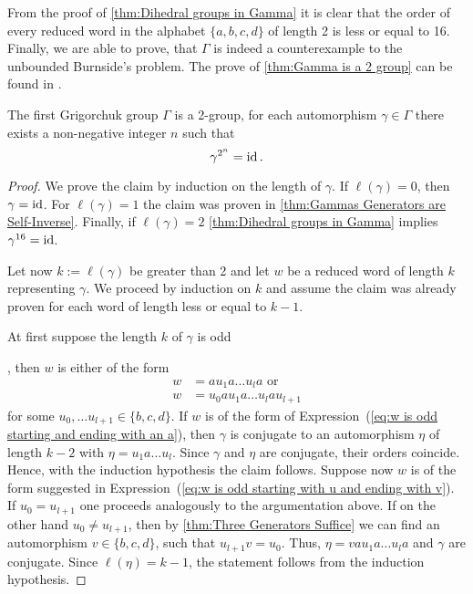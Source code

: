 From the proof of \cref{thm:Dihedral groups in Gamma} it is clear that the order of every reduced word in the alphabet $\lbrace a,b,c,d \rbrace$ of length 2 is less or equal to 16. Finally, we are able to prove, that $\Gamma$ is indeed a counterexample to the unbounded Burnside's problem. The prove of \cref{thm:Gamma is a 2 group} can be found in \cite{de2000topics}.
\begin{thm}\label{thm:Gamma is a 2 group}
The first Grigorchuk group $\Gamma$ is a 2-group, \ie for each automorphism $\gamma\in\Gamma$ there exists a non-negative integer $n$ such that
\begin{equation*}
\gamma^{2^n}=\operatorname{id}.
\end{equation*}
\end{thm}
\begin{proof}
We prove the claim by induction on the length of $\gamma$. \hypertarget{thm:Base Case}{If} $\ell(\gamma)=0$, then $\gamma=\operatorname{id}$. For $\ell(\gamma)=1$ the claim was proven in \cref{thm:Gammas Generators are Self-Inverse}. Finally, if $\ell(\gamma)=2$ \cref{thm:Dihedral groups in Gamma} implies $\gamma^{16}=\operatorname{id}$.

Let now $k:=\ell(\gamma)$ be greater than 2 and let $w$ be a reduced word of length $k$ representing $\gamma$. We proceed by induction on $k$ and assume the claim was already proven for each word of length less or equal to $k-1$.

\hypertarget{thm:k is odd}{At first suppose the length $k$ of $\gamma$ is odd}, then $w$ is either of the form
\begin{align}
w&=au_1a\ldots u_la\text{ or}\label{eq:w is odd starting and ending with an a}\\
w&=u_0au_1a\ldots u_lau_{l+1}\label{eq:w is odd starting with u and ending with v}
\end{align}
for some $u_0,\ldots u_{l+1}\in\lbrace b,c,d\rbrace$. If $w$ is of the form of Expression~(\ref{eq:w is odd starting and ending with an a}), then $\gamma$ is conjugate to an automorphism $\eta$ of length $k-2$ with $\eta=u_1a\ldots u_l$. Since $\gamma$ and $\eta$ are conjugate, their orders coincide. Hence, with the induction hypothesis the claim follows. Suppose now $w$ is of the form suggested in Expression~(\ref{eq:w is odd starting with u and ending with v}). If $u_0=u_{l+1}$ one proceeds analogously to the argumentation above. If on the other hand $u_0\not=u_{l+1}$, then by \cref{thm:Three Generators Suffice} we can find an automorphism $v\in\lbrace b,c,d\rbrace$, such that $u_{l+1}v=u_0$. Thus, $\eta=vau_1a\ldots u_la$ and $\gamma$ are conjugate. Since $\ell(\eta)=k-1$, the statement follows from the induction hypothesis.


\end{proof}
